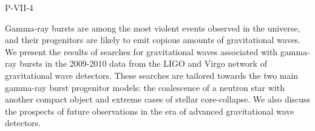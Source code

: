 P-VII-4


\bigskip



\bigskip

\noindent Gamma-ray bursts are among the most violent events observed in the
universe, and their progenitors are likely to emit copious amounts of
gravitational waves. We present the results of searches for
gravitational waves associated with gamma-ray bursts in the 2009-2010
data from the LIGO and Virgo network of gravitational wave
detectors. These searches are tailored towards the two
main gamma-ray burst progenitor models: the coalescence of a neutron
star with another compact object and extreme cases of stellar
core-collapse. We also discuss the prospects of future observations in
the era of advanced gravitational wave detectors.

